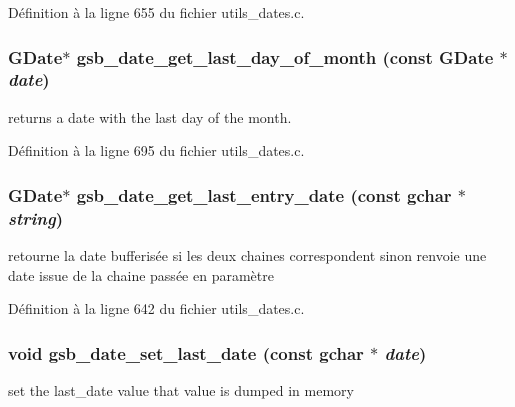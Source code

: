 Définition à la ligne 655 du fichier utils\_\-dates.c.

\subsubsection[{gsb\_\-date\_\-get\_\-last\_\-day\_\-of\_\-month}]{\setlength{\rightskip}{0pt plus 5cm}GDate$\ast$ gsb\_\-date\_\-get\_\-last\_\-day\_\-of\_\-month (const GDate $\ast$ {\em date})}\label{utils__dates_8h_a72b939da505a26d0409317e4742af1f6}
returns a date with the last day of the month. 

Définition à la ligne 695 du fichier utils\_\-dates.c.

\subsubsection[{gsb\_\-date\_\-get\_\-last\_\-entry\_\-date}]{\setlength{\rightskip}{0pt plus 5cm}GDate$\ast$ gsb\_\-date\_\-get\_\-last\_\-entry\_\-date (const gchar $\ast$ {\em string})}\label{utils__dates_8h_a60657a1332e700eeb88b1fc59ee2d25c}
retourne la date bufferisée si les deux chaines correspondent sinon renvoie une date issue de la chaine passée en paramètre 

Définition à la ligne 642 du fichier utils\_\-dates.c.

\subsubsection[{gsb\_\-date\_\-set\_\-last\_\-date}]{\setlength{\rightskip}{0pt plus 5cm}void gsb\_\-date\_\-set\_\-last\_\-date (const gchar $\ast$ {\em date})}\label{utils__dates_8h_aaac40b10a45d7e5d71c519b5d4755311}
set the last\_\-date value that value is dumped in memory


